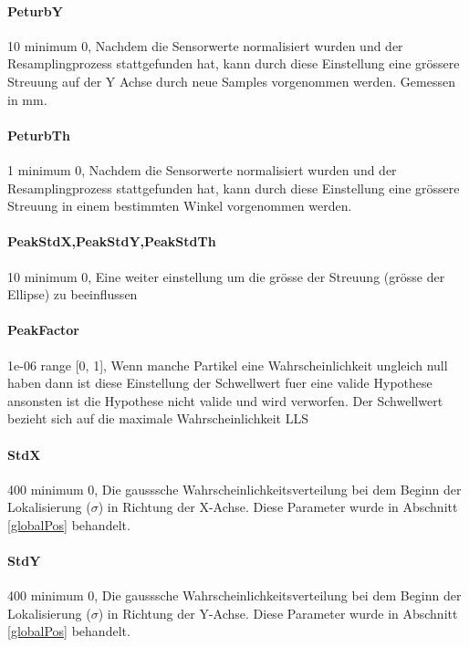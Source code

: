 \documentclass{article}
\begin{document}
\paragraph{PeturbY}\label{PeturbY} 10                minimum 0,   Nachdem die Sensorwerte normalisiert wurden und der Resamplingprozess stattgefunden hat, kann durch diese Einstellung eine gr\"ossere Streuung auf der Y Achse durch neue Samples vorgenommen werden. Gemessen in mm. 

\paragraph{PeturbTh}\label{PeturbTh} 1                minimum 0,  Nachdem die Sensorwerte normalisiert wurden und der Resamplingprozess stattgefunden hat, kann durch diese Einstellung eine gr\"ossere Streuung in einem bestimmten Winkel vorgenommen werden.

\paragraph{PeakStdX,PeakStdY,PeakStdTh} 10               minimum 0,  Eine weiter einstellung um die gr\"osse der Streuung (gr\"osse der Ellipse) zu beeinflussen


\paragraph{PeakFactor} 1e-06          range [0, 1], 
Wenn manche Partikel eine Wahrscheinlichkeit ungleich null haben dann ist diese Einstellung der Schwellwert fuer eine valide Hypothese ansonsten ist die Hypothese nicht valide und wird verworfen. Der Schwellwert bezieht sich auf die maximale Wahrscheinlichkeit LLS


\paragraph{StdX} 400                  minimum 0,  Die gausssche Wahrscheinlichkeitsverteilung bei dem Beginn der Lokalisierung ($\sigma$) in Richtung der X-Achse. Diese Parameter wurde in Abschnitt \ref{globalPos} behandelt.

\paragraph{StdY} 400                  minimum 0,   Die gausssche Wahrscheinlichkeitsverteilung bei dem Beginn der Lokalisierung ($\sigma$) in Richtung der Y-Achse. Diese Parameter wurde in Abschnitt \ref{globalPos} behandelt.
\end{document}
